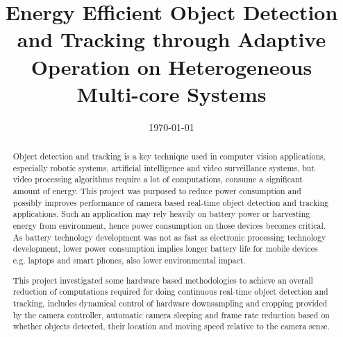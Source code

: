 \documentclass[openany]{ecsproject}     %
\begin{document}
\frontmatter
\title      {Energy Efficient Object Detection and Tracking through Adaptive Operation on Heterogeneous Multi-core Systems}
\addresses  {\groupname\\\deptname\\\univname}
\date       {\today}
\subject    {}
\keywords   {}
\maketitle

\begin{abstract}
Object detection and tracking is a key technique used in computer vision applications, especially robotic systems, artificial intelligence and video surveillance systems, but video processing algorithms require a lot of computations, consume a significant amount of energy. This project was purposed to reduce power consumption and possibly improves performance of camera based real-time object detection and tracking applications. Such an application may rely heavily on battery power or harvesting energy from environment, hence power consumption on those devices becomes critical. As battery technology development was not as fast as electronic processing technology development, lower power consumption implies longer battery life for mobile devices e.g. laptops and smart phones, also lower environmental impact.

This project investigated some hardware based methodologies to achieve an overall reduction of computations required for doing continuous real-time object detection and tracking, includes dynamical control of hardware downsampling and cropping provided by the camera controller, automatic camera sleeping and frame rate reduction based on whether objects detected, their location and moving speed relative to the camera sense.
\end{abstract}

\tableofcontents

\mainmatter







\appendix

\titleformat{\chapter}[hang]{\Large\bfseries}{\chaptertitlename\ \thechapter}{0.75cm}{\Large\bfseries}




\backmatter

\end{document}
